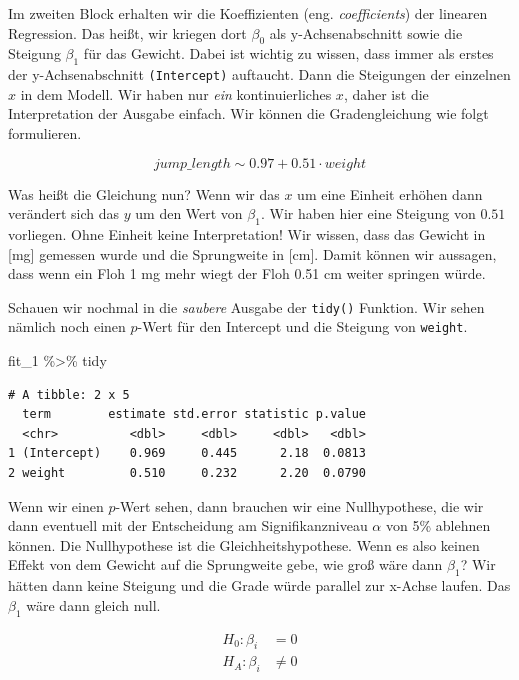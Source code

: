 \documentclass[
  letterpaper,
]{scrbook}
\newenvironment{Shaded}{\begin{snugshade}}{\end{snugshade}}
\newcommand{\NormalTok}[1]{\textcolor[rgb]{0.00,0.23,0.31}{#1}}
\newcommand{\SpecialCharTok}[1]{\textcolor[rgb]{0.37,0.37,0.37}{#1}}
\begin{document}
Im zweiten Block erhalten wir die Koeffizienten (eng.
\emph{coefficients}) der linearen Regression. Das heißt, wir kriegen
dort \(\beta_0\) als y-Achsenabschnitt sowie die Steigung \(\beta_1\)
für das Gewicht. Dabei ist wichtig zu wissen, dass immer als erstes der
y-Achsenabschnitt \texttt{(Intercept)} auftaucht. Dann die Steigungen
der einzelnen \(x\) in dem Modell. Wir haben nur \emph{ein}
kontinuierliches \(x\), daher ist die Interpretation der Ausgabe
einfach. Wir können die Gradengleichung wie folgt formulieren.

\[
jump\_length \sim 0.97 + 0.51 \cdot weight
\]

Was heißt die Gleichung nun? Wenn wir das \(x\) um eine Einheit erhöhen
dann verändert sich das \(y\) um den Wert von \(\beta_1\). Wir haben
hier eine Steigung von \(0.51\) vorliegen. Ohne Einheit keine
Interpretation! Wir wissen, dass das Gewicht in {[}mg{]} gemessen wurde
und die Sprungweite in {[}cm{]}. Damit können wir aussagen, dass wenn
ein Floh 1 mg mehr wiegt der Floh 0.51 cm weiter springen würde.

Schauen wir nochmal in die \emph{saubere} Ausgabe der \texttt{tidy()}
Funktion. Wir sehen nämlich noch einen \(p\)-Wert für den Intercept und
die Steigung von \texttt{weight}.

\begin{Shaded}
\begin{Highlighting}[]
\NormalTok{fit\_1 }\SpecialCharTok{\%\textgreater{}\%}\NormalTok{ tidy}
\end{Highlighting}
\end{Shaded}

\begin{verbatim}
# A tibble: 2 x 5
  term        estimate std.error statistic p.value
  <chr>          <dbl>     <dbl>     <dbl>   <dbl>
1 (Intercept)    0.969     0.445      2.18  0.0813
2 weight         0.510     0.232      2.20  0.0790
\end{verbatim}

Wenn wir einen \(p\)-Wert sehen, dann brauchen wir eine Nullhypothese,
die wir dann eventuell mit der Entscheidung am Signifikanzniveau
\(\alpha\) von 5\% ablehnen können. Die Nullhypothese ist die
Gleichheitshypothese. Wenn es also keinen Effekt von dem Gewicht auf die
Sprungweite gebe, wie groß wäre dann \(\beta_1\)? Wir hätten dann keine
Steigung und die Grade würde parallel zur x-Achse laufen. Das
\(\beta_1\) wäre dann gleich null.

\[
\begin{align*} 
H_0: \beta_i &= 0\\  
H_A: \beta_i &\neq 0 \\   
\end{align*}
\]
\end{document}
